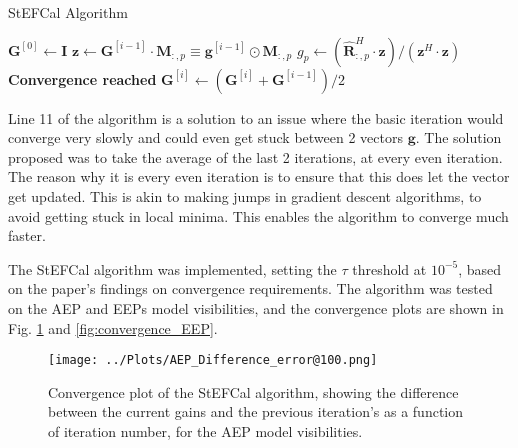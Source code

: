 \documentclass[12pt]{report} %
\begin{document}
\begin{definitionbox}{StEFCal Algorithm}
  \begin{algorithmic}[1]
      \State $\mathbf{G}^{[0]} \gets \mathbf{I}$ 
       
           
            \State $\mathbf{z} \gets \mathbf{G}^{[i-1]} \cdot \mathbf{M}_{:,p} \equiv \mathbf{g}^{[i - 1]} \odot \mathbf{M}_{:,p} $
            \State $g_{p} \gets (\mathbf{\hat{R}}^{H}_{:,p} \cdot \mathbf{z})/(\mathbf{z}^{H} \cdot \mathbf{z})$
          \EndFor
           
             
              \State \textbf{Convergence reached}
            \Else
              \State $\mathbf{G}^{[i]} \gets (\mathbf{G}^{[i]} + \mathbf{G}^{[i - 1]})/2$ 
            \EndIf
          \EndIf
      \EndFor
      \end{algorithmic}
\end{definitionbox}

Line 11 of the algorithm is a solution to an issue where the basic iteration would converge very slowly and could even get stuck between 2 vectors $\mathbf{g}$. The solution proposed was to take the average of the last 2 iterations, at every even iteration\cite{salvini2014fast}. The reason why it is every even iteration is to ensure that this does let the vector get updated. This is akin to making jumps in gradient descent algorithms, to avoid getting stuck in local minima. This enables the algorithm to converge much faster.

The StEFCal algorithm was implemented, setting the $\tau$ threshold at $10^{-5}$, based on the paper's findings on convergence requirements\cite[p.7]{salvini2014fast}. The algorithm was tested on the AEP and EEPs model visibilities, and the convergence plots are shown in Fig. \ref{fig:convergence_AEP} and \ref{fig:convergence_EEP}.

\begin{figure}[h]
    \centering
    \texttt{[image: ../Plots/AEP\_Difference\_error@100.png]}
    \caption{Convergence plot of the StEFCal algorithm, showing the difference between the current gains and the previous iteration's as a function of iteration number, for the AEP model visibilities.}
    \label{fig:convergence_AEP}
\end{figure}
\end{document}
